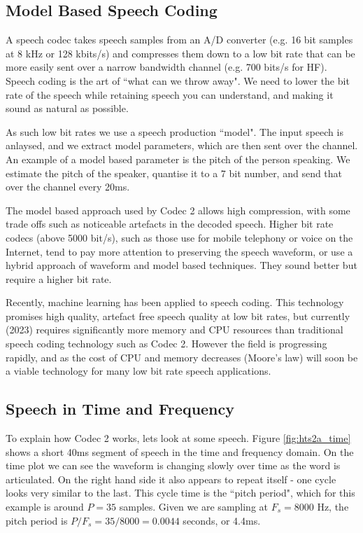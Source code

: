 \documentclass{article}
\begin{document}
\subsection{Model Based Speech Coding}

A speech codec takes speech samples from an A/D converter (e.g. 16 bit samples at 8 kHz or 128 kbits/s) and compresses them down to a low bit rate that can be more easily sent over a narrow bandwidth channel (e.g. 700 bits/s for HF).  Speech coding is the art of ``what can we throw away". We need to lower the bit rate of the speech while retaining speech you can understand, and making it sound as natural as possible.

As such low bit rates we use a speech production ``model".  The input speech is anlaysed, and we extract model parameters, which are then sent over the channel.  An example of a model based parameter is the pitch of the person speaking.  We estimate the pitch of the speaker, quantise it to a 7 bit number, and send that over the channel every 20ms.

The model based approach used by Codec 2 allows high compression, with some trade offs such as noticeable artefacts in the decoded speech.  Higher bit rate codecs (above 5000 bit/s), such as those use for mobile telephony or voice on the Internet, tend to pay more attention to preserving the speech waveform, or use a hybrid approach of waveform and model based techniques.  They sound better but require a higher bit rate.

Recently, machine learning has been applied to speech coding.  This technology promises high quality, artefact free speech quality at low bit rates, but currently (2023) requires significantly more memory and CPU resources than traditional speech coding technology such as Codec 2.  However the field is progressing rapidly, and as the cost of CPU and memory decreases (Moore's law) will soon be a viable technology for many low bit rate speech applications.

\subsection{Speech in Time and Frequency}

To explain how Codec 2 works, lets look at some speech. Figure \ref{fig:hts2a_time} shows a short 40ms segment of speech in the time and frequency domain.  On the time plot we can see the waveform is changing slowly over time as the word is articulated.  On the right hand side it also appears to repeat itself - one cycle looks very similar to the last.  This cycle time is the ``pitch period", which for this example is around $P=35$ samples.  Given we are sampling at $F_s=8000$ Hz, the pitch period is $P/F_s=35/8000=0.0044$ seconds, or 4.4ms.
\end{document}
